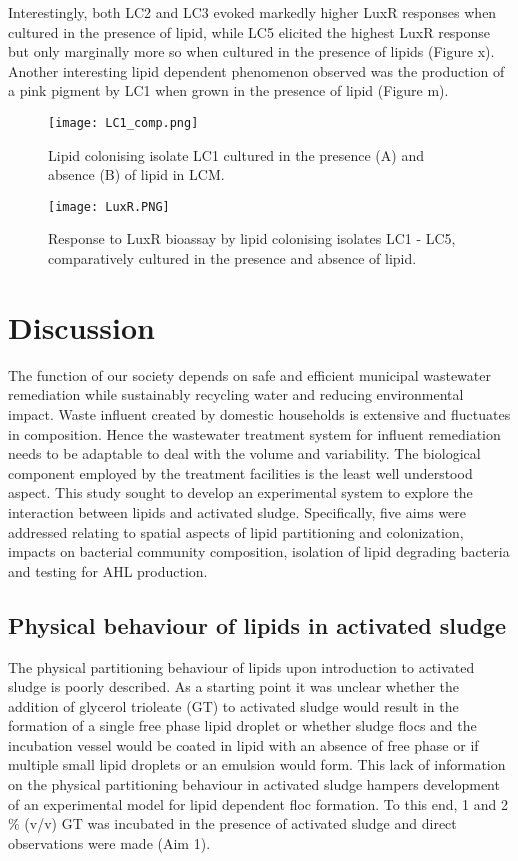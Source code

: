 \documentclass[11pt]{article}
\begin{document}
Interestingly, both LC2 and LC3 evoked markedly higher LuxR responses when cultured in the presence of lipid, while LC5 elicited the highest LuxR response but only marginally more so when cultured in the presence of lipids (Figure x). Another interesting lipid dependent phenomenon observed was the production of a pink pigment by LC1 when grown in the presence of lipid (Figure m).

\begin{figure}
\texttt{[image: LC1\_comp.png]}
\caption{Lipid colonising isolate LC1 cultured in the presence (A) and absence (B) of lipid in LCM.}
\end{figure}

\begin{figure}
\texttt{[image: LuxR.PNG]}
\caption{Response to LuxR bioassay by lipid colonising isolates LC1 - LC5, comparatively cultured in the presence and absence of lipid.}
\end{figure}

\FloatBarrier

\newpage
\section{Discussion}
The function of our society depends on safe and efficient municipal wastewater remediation while sustainably recycling water and reducing environmental impact. Waste influent created by domestic households is extensive and fluctuates in composition. Hence the wastewater treatment system for influent remediation needs to be adaptable to deal with the volume and variability. The biological component employed by the treatment facilities is the least well understood aspect. This study sought to develop an experimental system to explore the interaction between lipids and activated sludge. Specifically, five aims were addressed relating to spatial aspects of lipid partitioning and colonization, impacts on bacterial community composition, isolation of lipid degrading bacteria and testing for AHL production.

\subsection{Physical behaviour of lipids in activated sludge}
The physical partitioning behaviour of lipids upon introduction to activated sludge is poorly described. As a starting point it was unclear whether the addition of glycerol trioleate (GT) to activated sludge would result in the formation of a single free phase lipid droplet or whether sludge flocs and the incubation vessel would be coated in lipid with an absence of free phase or if multiple small lipid droplets or an emulsion would form. This lack of information on the physical partitioning behaviour in activated sludge hampers development of an experimental model for lipid dependent floc formation. To this end, 1 and 2 \% (v/v) GT was incubated in the presence of activated sludge and direct observations were made (Aim 1). \\
\end{document}
